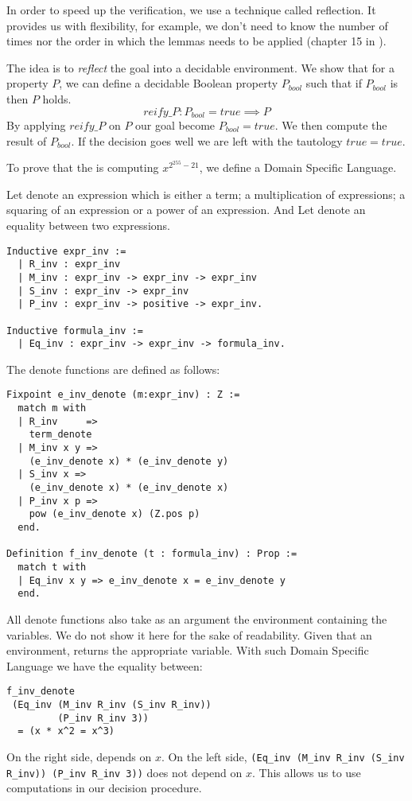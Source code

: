 In order to speed up the verification, we use a technique called reflection.
It provides us with flexibility, for example, we don't need to know the number of
times nor the order in which the lemmas needs to be applied (chapter 15 in \cite{CpdtJFR}).

The idea is to \textit{reflect} the goal into a decidable environment.
We show that for a property $P$, we can define a decidable Boolean property
$P_{bool}$ such that if $P_{bool}$ is  then $P$ holds.
$$reify\_P : P_{bool} = true \implies P$$
By applying $reify\_P$ on $P$ our goal become $P_{bool} = true$.
We then compute the result of $P_{bool}$. If the decision goes well we are
left with the tautology $true = true$.

To prove that the  is computing $x^{2^{255}-21}$,
we define a Domain Specific Language.
\begin{definition}
Let  denote an expression which is either a term;
a multiplication of expressions; a squaring of an expression or a power of an expression.
And Let  denote an equality between two expressions.
\end{definition}
\begin{lstlisting}[language=Coq]
Inductive expr_inv :=
  | R_inv : expr_inv
  | M_inv : expr_inv -> expr_inv -> expr_inv
  | S_inv : expr_inv -> expr_inv
  | P_inv : expr_inv -> positive -> expr_inv.

Inductive formula_inv :=
  | Eq_inv : expr_inv -> expr_inv -> formula_inv.
\end{lstlisting}
The denote functions are defined as follows:
\begin{lstlisting}[language=Coq]
Fixpoint e_inv_denote (m:expr_inv) : Z :=
  match m with
  | R_inv     =>
    term_denote
  | M_inv x y =>
    (e_inv_denote x) * (e_inv_denote y)
  | S_inv x =>
    (e_inv_denote x) * (e_inv_denote x)
  | P_inv x p =>
    pow (e_inv_denote x) (Z.pos p)
  end.

Definition f_inv_denote (t : formula_inv) : Prop :=
  match t with
  | Eq_inv x y => e_inv_denote x = e_inv_denote y
  end.
\end{lstlisting}
All denote functions also take as an argument the environment containing the variables.
We do not show it here for the sake of readability.
Given that an environment,  returns the appropriate variable.
With such Domain Specific Language we have the equality between:
\begin{lstlisting}[backgroundcolor=\color{white}]
f_inv_denote
 (Eq_inv (M_inv R_inv (S_inv R_inv))
         (P_inv R_inv 3))
  = (x * x^2 = x^3)
\end{lstlisting}
On the right side,  depends on $x$. On the left side,
\texttt{(Eq\_inv (M\_inv R\_inv (S\_inv R\_inv)) (P\_inv R\_inv 3))} does not depend on $x$.
This allows us to use computations in our decision procedure.

